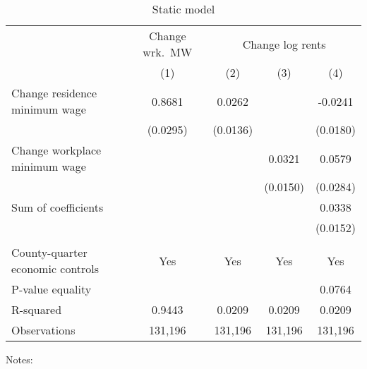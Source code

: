 \begin{table}[hbt!] \centering
    \caption{Static model}
    \label{tab:static}
    \begin{tabular}{l*{4}{c}}
        \toprule
        & \multicolumn{1}{c}{Change wrk.\ MW}
            & \multicolumn{3}{c}{Change log rents}                            \\ \cmidrule(lr){2-2}\cmidrule(lr){3-5}
                                           & (1)   & (2)   & (3)   & (4)      \\ \midrule
        Change residence minimum wage      &  0.8681  &  0.0262  &       &  -0.0241     \\
                                           & (0.0295) & (0.0136) &       & (0.0180)    \\
        Change workplace minimum wage      &       &       &  0.0321  & 0.0579      \\
                                           &       &       & (0.0150) & (0.0284)    \\ \midrule
        Sum of coefficients                &       &       &       &  0.0338     \\
                                           &       &       &       & (0.0152)    \\
                                           &       &       &       &          \\ \midrule
        County-quarter economic controls   &  Yes  & Yes   & Yes   & Yes      \\
        P-value equality                   &       &       &       & 0.0764      \\
        R-squared                          &  0.9443  &  0.0209  &  0.0209  & 0.0209      \\
        Observations                       & 131,196  & 131,196  & 131,196  & 131,196     \\\bottomrule
    \end{tabular}

    \begin{minipage}{.95\textwidth} \footnotesize
        \vspace{2mm}
        Notes: 
    \end{minipage}
\end{table}
